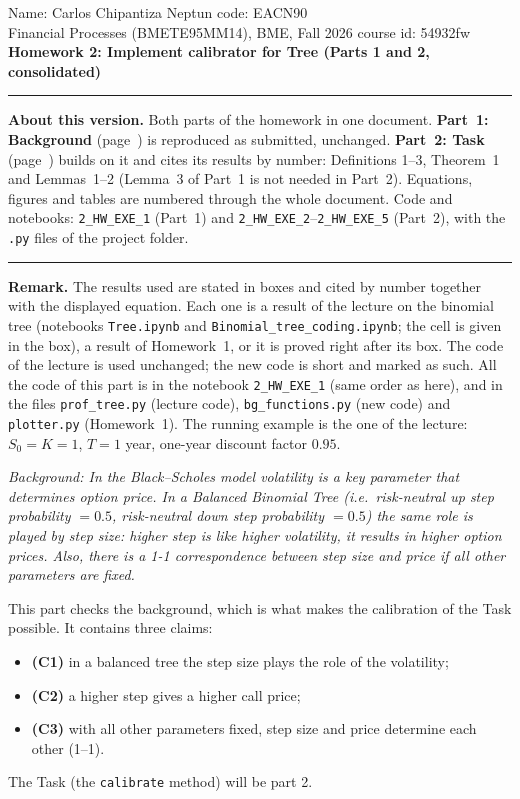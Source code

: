 \documentclass[11pt,a4paper]{article}
\newcommand{\subhead}[1]{\par\medskip\noindent{\large\bfseries #1}\par\smallskip\noindent\ignorespaces}
\newcommand{\parthead}[1]{\par\bigskip\noindent{\LARGE\bfseries #1}\par\noindent\rule{\textwidth}{0.8pt}\par\smallskip}
\begin{document}
\noindent Name: Carlos Chipantiza \hfill Neptun code: EACN90\\
\noindent Financial Processes (BMETE95MM14), BME, Fall 2026 \hfill course id: 54932fw\\[2pt]
{\large\textbf{Homework 2: Implement calibrator for Tree (Parts 1 and 2, consolidated)}}\\[2pt]
\noindent\rule{\textwidth}{0.4pt}

\noindent\textbf{About this version.} Both parts of the homework in one document. \textbf{Part~1: Background} (page~\pageref{part1}) is reproduced as submitted, unchanged. \textbf{Part~2: Task} (page~\pageref{part2}) builds on it and cites its results by number: Definitions 1--3, Theorem~1 and Lemmas~1--2 (Lemma~3 of Part~1 is not needed in Part~2). Equations, figures and tables are numbered through the whole document. Code and notebooks: \texttt{2\_HW\_EXE\_1} (Part~1) and \texttt{2\_HW\_EXE\_2}--\texttt{2\_HW\_EXE\_5} (Part~2), with the \texttt{.py} files of the project folder.

\parthead{Part 1: Background}\label{part1}

\noindent\textbf{Remark.} The results used are stated in boxes and cited by number together with the displayed equation. Each one is a result of the lecture on the binomial tree (notebooks \texttt{Tree.ipynb} and \texttt{Binomial\_tree\_coding.ipynb}; the cell is given in the box), a result of Homework~1, or it is proved right after its box. The code of the lecture is used unchanged; the new code is short and marked as such. All the code of this part is in the notebook \texttt{2\_HW\_EXE\_1} (same order as here), and in the files \texttt{prof\_tree.py} (lecture code), \texttt{bg\_functions.py} (new code) and \texttt{plotter.py} (Homework~1). The running example is the one of the lecture: $S_0=K=1$, $T=1$ year, one-year discount factor $0.95$.

\vspace{0.5 cm}
\subhead{The assignment.}
\emph{Background: In the Black--Scholes model volatility is a key parameter that determines option price. In a Balanced Binomial Tree (i.e.\ risk-neutral up step probability $=0.5$, risk-neutral down step probability $=0.5$) the same role is played by step size: higher step is like higher volatility, it results in higher option prices. Also, there is a 1-1 correspondence between step size and price if all other parameters are fixed.}

\noindent This part checks the background, which is what makes the calibration of the Task possible. It contains three claims:
\begin{itemize}
\item \textbf{(C1)} in a balanced tree the step size plays the role of the volatility;
\item \textbf{(C2)} a higher step gives a higher call price;
\item \textbf{(C3)} with all other parameters fixed, step size and price determine each other (1--1).
\end{itemize}
The Task (the \texttt{calibrate} method) will be part 2.
\end{document}
